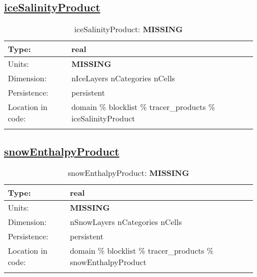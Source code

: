 \subsection[iceSalinityProduct]{\hyperref[sec:var_tab_tracer_products]{iceSalinityProduct}}
\label{subsec:var_sec_tracer_products_iceSalinityProduct}
\begin{center}
\begin{longtable}{| p{2.0in} | p{4.0in} |}
        \hline 
        Type: & real \\
        \hline 
        Units: & {\bf \color{red} MISSING} \\
        \hline 
        Dimension: & nIceLayers nCategories nCells \\
        \hline 
        Persistence: & persistent \\
        \hline 
         Location in code: & domain \% blocklist \% tracer\_products \% iceSalinityProduct \\
         \hline 
    \caption{iceSalinityProduct: {\bf \color{red} MISSING}}
\end{longtable}
\end{center}
\subsection[snowEnthalpyProduct]{\hyperref[sec:var_tab_tracer_products]{snowEnthalpyProduct}}
\label{subsec:var_sec_tracer_products_snowEnthalpyProduct}
\begin{center}
\begin{longtable}{| p{2.0in} | p{4.0in} |}
        \hline 
        Type: & real \\
        \hline 
        Units: & {\bf \color{red} MISSING} \\
        \hline 
        Dimension: & nSnowLayers nCategories nCells \\
        \hline 
        Persistence: & persistent \\
        \hline 
         Location in code: & domain \% blocklist \% tracer\_products \% snowEnthalpyProduct \\
         \hline 
    \caption{snowEnthalpyProduct: {\bf \color{red} MISSING}}
\end{longtable}
\end{center}
